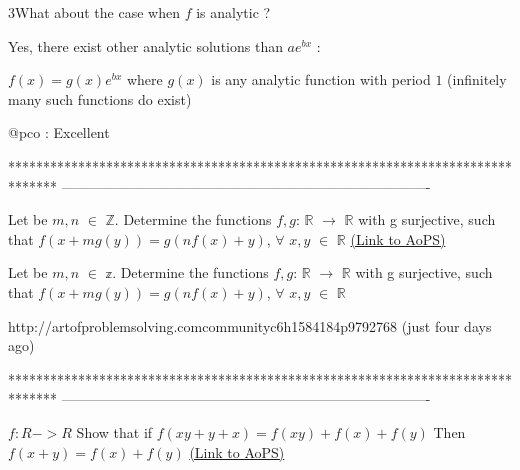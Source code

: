 \begin{solution}
	\begin{tcolorbox}3\/What about the case when $f$ is analytic ?\end{tcolorbox}
Yes, there exist other analytic solutions than $a e^{bx}$ :

$f(x)=g(x)e^{bx}$ where $g(x)$ is any analytic function with period $1$ (infinitely many such functions do exist)



\end{solution}



\begin{solution}
	@pco : Excellent
\end{solution}
*******************************************************************************
-------------------------------------------------------------------------------

\begin{problem}
	Let be $m,n$ $\in$ $\mathbb{Z}$. Determine the functions $f,g$: $\mathbb{R}$ $\longrightarrow$ $\mathbb{R}$  with g surjective, such that $f(x+mg(y))=g(nf(x)+y)$, $\forall$ $x,y$ $\in$ $\mathbb{R}$
	\flushright \href{https://artofproblemsolving.com/community/c6h1588021}{(Link to AoPS)}
\end{problem}



\begin{solution}
	\begin{tcolorbox}Let be $m,n$ $\in$ $\mathbb{z}$. Determine the functions $f,g$: $\mathbb{R}$ $\longrightarrow$ $\mathbb{R}$  with g surjective, such that $f(x+mg(y))=g(nf(x)+y)$, $\forall$ $x,y$ $\in$ $\mathbb{R}$\end{tcolorbox}

http://artofproblemsolving.com\/community\/c6h1584184p9792768 (just four days ago)
\end{solution}
*******************************************************************************
-------------------------------------------------------------------------------

\begin{problem}
	$f: R-> R$
Show that if
$f(xy+y+x)=f(xy)+f(x)+f(y)$
Then 
$f(x+y)=f(x)+f(y)$
	\flushright \href{https://artofproblemsolving.com/community/c6h1588141}{(Link to AoPS)}
\end{problem}



